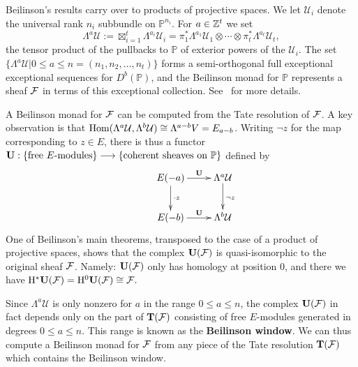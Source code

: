 \documentclass[twoside,12pt, leqno]{amsart}
\def\PP{{\mathbb P}}
\DeclareMathOperator{\rH}{{\rm H}}
\def\bT{{\bf T}}
\def\bU{{\bf U}}
\def\rH{{\rm H}}
\def\CU{{\mathcal U}}
\begin{document}


Beilinson's results carry over to products of projective spaces.  We let $\CU_i$ denote the universal rank $n_i$ subbundle on $\PP^{n_i}$.  For $a\in {\mathbb Z}^{t}$ we set
$$
\Lambda^a \CU := \boxtimes_{i=1}^t \Lambda^{a_i} \CU_i=\pi_1^*\Lambda^{a_1}\CU_1 \otimes \cdots \otimes \pi_t^*\Lambda^{a_t} \CU_t,
$$
the tensor product of the pullbacks to $\PP$ of exterior powers of the $\CU_i$. The set $\{\Lambda^a \CU | 0 \leq a \leq n=(n_1,n_2,\dots,n_t)\}$ forms a semi-orthogonal full exceptional exceptional sequences for $D^b(\PP)$, and the Beilinson monad for $\PP$ represents a sheaf ${\mathcal F}$ in terms of this exceptional collection.  See~\cite[\S2]{EES} for more details.

A Beilinson monad for ${\mathcal F}$ can be computed from the Tate resolution of ${\mathcal F}$.  A key observation is that $\Hom(\Lambda^a \CU,\Lambda^b\CU) \cong \Lambda^{a-b} V=E_{a-b}$.  Writing $\neg z$ for the map corresponding to $z\in E$, there is thus a functor
$
\bU: \{ \hbox{free $E$-modules}\} \longrightarrow \{ \hbox{coherent sheaves on $\PP$} \}  \\
$ defined by
\[
\xymatrix{
&E(-a)\ar[r]^-{\bU}\ar[d]^-{\cdot z}&\Lambda^a \CU\ar[d]^{\neg z}\\
&E(-b)\ar[r]^-{\bU}&\Lambda^b \CU\\
}
\]
One of Beilinson's main theorems, transposed to the case of a product of projective spaces, shows that the complex $\bU(\sF)$ is quasi-isomorphic to the original sheaf ${\mathcal F}$.  Namely: $\bU(\sF)$ only has homology at position $0$, and there we have $ \rH^* \bU(\sF) = \rH^0 \bU(\sF) \cong \sF.$

Since  $\Lambda^a \CU$ is only nonzero for $a$ in the range $0 \le a \le n$, the complex $\bU(\sF)$ in fact depends only on the  part of $\bT(\sF)$ consisting of free $E$-modules generated in degrees $0\le a \le n$.  This range is known as the {\bf Beilinson window}.  We can thus  compute a Beilinson monad for ${\mathcal F}$ from any piece of the Tate resolution $\bT(\sF)$ which contains the Beilinson window.
\end{document}
